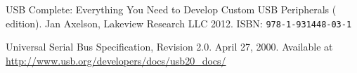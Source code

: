\documentclass{article}
\begin{document}
\pagebreak

\renewcommand{\refname}{References}
\begin{thebibliography}{}
   USB Complete: Everything You Need to Develop
               Custom USB Peripherals ( edition).
               Jan Axelson, Lakeview Research LLC 2012.
               ISBN: {\tt   978-1-931448-03-1}
  \setcounter{firstbib}{\value{enumiv}}
\end{thebibliography}

\renewcommand{\refname}{Links}
\begin{thebibliography}{}
  \setcounter{enumiv}{\value{firstbib}}
  
   Universal Serial Bus Specification, Revision 2.0.
                   April 27, 2000. Available at
                   \url{http://www.usb.org/developers/docs/usb20_docs/}
\end{thebibliography}
\end{document}
